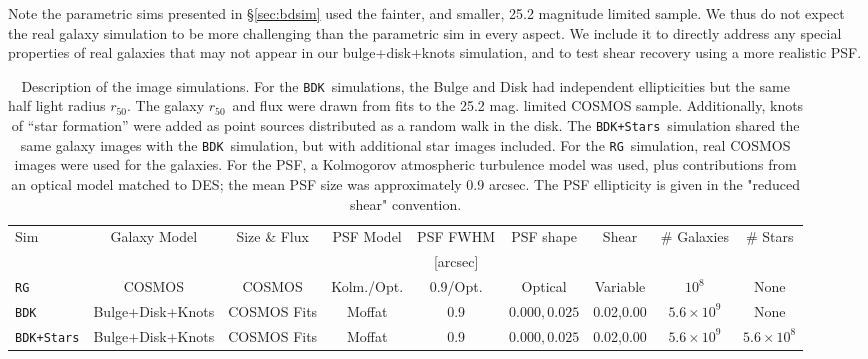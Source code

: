 \documentclass[a4paper,fleqn,usenatbib]{mnras}
\newcommand{\hlr}{$r_{50}$}
\newcommand{\nsimShear}{0.02,0.00}
\newcommand{\nsimNgal}{$10^8$}
\newcommand{\nsimNgalBD}{$5.6 \times 10^9$}
\newcommand{\nsimNStar}{$5.6 \times 10^8$}
\newcommand{\nsimPSFShape}{$0.000,0.025$}
\newcommand{\psfrdist}{0.9}
\newcommand{\galrdist}{COSMOS Fits}
\newcommand{\cosmosname}{COSMOS}
\newcommand{\bdsim}{\texttt{BDK}}
\newcommand{\bdstar}{\texttt{BDK+Stars}}
\newcommand{\rgsim}{\texttt{RG}}
\begin{document}
Note the parametric sims presented in \S \ref{sec:bdsim} used the fainter, and
smaller, 25.2 magnitude limited sample.  We thus do not expect the real galaxy
simulation to be more challenging than the parametric sim in every aspect. We
include it to directly address any special properties of real galaxies that may
not appear in our bulge+disk+knots simulation, and to test shear recovery using
a more realistic PSF.



\begin{table}
    \centering

    \caption{Description of the image simulations.  For the \bdsim\
    simulations, the Bulge and Disk had independent ellipticities but the same
    half light radius \hlr.  The galaxy \hlr\ and flux were drawn from fits to the 25.2 mag.
    limited COSMOS sample.  Additionally, knots of ``star formation'' were added as
    point sources distributed as a random walk in the disk.  The \bdstar\
    simulation shared the same galaxy images with the \bdsim\ simulation, but
    with additional star images included.  For
    the \rgsim\ simulation, real COSMOS images were used for the galaxies. For
    the PSF, a  Kolmogorov atmospheric turbulence model was used, 
    plus contributions from an optical model matched to DES; the mean PSF size
    was approximately 0.9 arcsec. The PSF ellipticity is given in the "reduced
    shear" convention.
    \label{tab:sims}}

    \begin{tabular}{ | l | c | c | c | c | c | c | c | c | }
        Sim          & Galaxy Model      & Size \& Flux   & PSF Model   & PSF FWHM        & PSF shape     & Shear & \# Galaxies    & \# Stars     \\
                     &                   &             &             & [arcsec]        &               &       &               &              \\
        \hline
        \rgsim       & \cosmosname       & \cosmosname & Kolm./Opt.  & \psfrdist/Opt.  & Optical       &  Variable & \nsimNgal     & None            \\
        \bdsim       & Bulge+Disk+Knots  & \galrdist   & Moffat      & \psfrdist       & \nsimPSFShape &  \nsimShear & \nsimNgalBD & None            \\
        \bdstar      & Bulge+Disk+Knots  & \galrdist   & Moffat      & \psfrdist       & \nsimPSFShape &  \nsimShear & \nsimNgalBD & \nsimNStar       \\
    \end{tabular}
\end{table}
\end{document}
